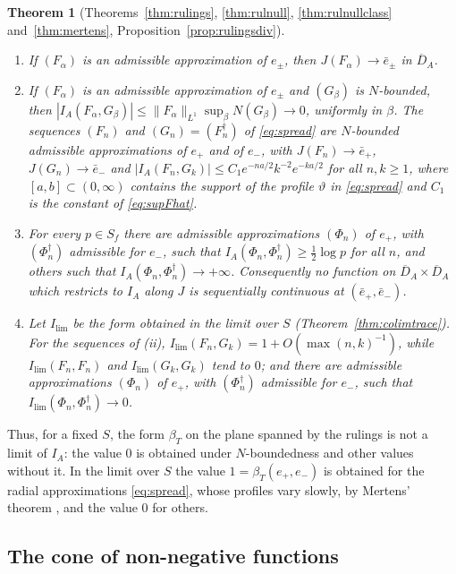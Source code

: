 \documentclass[11pt]{amsart}
\newtheorem{theorem}{Theorem}[section]
\theoremstyle{definition}
\theoremstyle{remark}
\begin{document}
\begin{theorem}[Theorems~\ref{thm:rulings}, \ref{thm:rulnull},
\ref{thm:rulnullclass} and~\ref{thm:mertens},
Proposition~\ref{prop:rulingsdiv}]\label{thm:introD}
\begin{enumerate}
\item[(i)] If $(F_{\alpha})$ is an admissible approximation of $e_{\pm}$, then
$J(F_{\alpha})\to\bar e_{\pm}$ in $\overline{D}_A$.
\item[(ii)] If $(F_{\alpha})$ is an admissible approximation of $e_{\pm}$ and
$(G_{\beta})$ is $N$-bounded, then
$|I_A(F_{\alpha},G_{\beta})|\le\lVert F_{\alpha}\rVert_{L^{1}}
\sup_{\beta}N(G_{\beta})\to0$, uniformly in $\beta$.  The sequences $(F_n)$
and $(G_n)=(F_n^{\dagger})$ of \eqref{eq:spread} are $N$-bounded admissible
approximations of $e_+$ and of $e_-$, with $J(F_n)\to\bar e_+$,
$J(G_n)\to\bar e_-$ and
$|I_A(F_n,G_k)|\le C_1e^{-na/2}k^{-2}e^{-ka/2}$ for all $n,k\ge1$, where
$[a,b]\subset(0,\infty)$ contains the support of the profile $\vartheta$ in
\eqref{eq:spread} and $C_1$ is the constant of \eqref{eq:supFhat}.
\item[(iii)] For every $p\in S_f$ there are admissible approximations
$(\Phi_n)$ of $e_+$, with $(\Phi_n^{\dagger})$ admissible for $e_-$, such that
$I_A(\Phi_n,\Phi_n^{\dagger})\ge\tfrac12\log p$ for all $n$, and others such
that $I_A(\Phi_n,\Phi_n^{\dagger})\to+\infty$.  Consequently no function on
$\overline{D}_A\times\overline{D}_A$ which restricts to $I_A$ along $J$ is
sequentially continuous at $(\bar e_+,\bar e_-)$.
\item[(iv)] Let $I_{\lim}$ be the form obtained in the limit over $S$
(Theorem~\ref{thm:colimtrace}).  For the sequences of \emph{(ii)},
$I_{\lim}(F_n,G_k)=1+O(\max(n,k)^{-1})$, while
$I_{\lim}(F_n,F_n)$ and $I_{\lim}(G_k,G_k)$ tend to $0$; and there are
admissible approximations $(\Phi_n)$ of $e_+$, with $(\Phi_n^{\dagger})$
admissible for $e_-$, such that $I_{\lim}(\Phi_n,\Phi_n^{\dagger})\to0$.
\end{enumerate}
\end{theorem}

Thus, for a fixed $S$, the form $\beta_T$ on the plane spanned by the rulings
is not a limit of $I_A$: the value $0$ is obtained under $N$-boundedness and
other values without it.  In the limit over $S$ the value
$1=\beta_T(e_+,e_-)$ is obtained for the radial approximations
\eqref{eq:spread}, whose profiles vary slowly, by Mertens' theorem
\cite{Mertens}, and the value $0$ for others.

\subsection*{The cone of non-negative functions}
\end{document}
